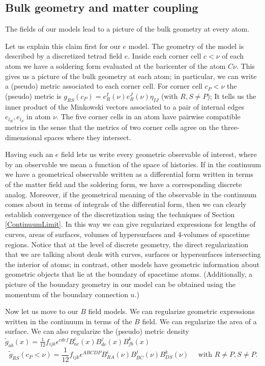 \documentclass{article}
\begin{document}
\subsection{Bulk geometry and matter coupling}

The fields of our models lead to a picture of the bulk geometry at every atom. 

Let us explain this claim first for our $e$ model. The geometry of the model is described by a discretized tetrad field $e$. Inside each corner cell $c < \nu$ of each atom we have a soldering form evaluated at the baricenter of the atom $C\nu$. This gives us a picture of the bulk geometry at each atom; in particular, we can write a (pseudo) metric associated to each corner cell. 
For corner cell $c_P < \nu$ the (pseudo) metric is  
$g_{RS}(c_P) = e_R^I (\nu) e_R^J (\nu) \eta_{IJ}$ (with $R,S \neq P$); 
It tells us the inner product of the Minkowski vectors associated to a pair of internal edges $e_{l_R} , e_{l_S}$ in atom $\nu$. 
The five corner cells in an atom have pairwise compatible metrics in the sense that the metrics of two corner cells agree on the three-dimensional spaces where they intersect. 

Having such an $e$ field lets us write every geometric observable of interest, where by an observable we mean a function of the space of histories. 
If in the continuum we have a geometrical observable written as a differential form written in terms of the matter field and the soldering form, we have a corresponding discrete analog. Moreover, if the geometrical meaning of the observable in the continuum comes about in terms of integrals of the differential form, then we can clearly establish convergence of the discretization using the techniques of Section \ref{ContinuumLimit}. In this way we can give regularized expressions for lengths of curves, areas of surfaces, volumes of hypersurfaces and 4-volumes of spacetime regions. Notice that at the level of discrete geometry, the direct regularization that we are talking about deals with curves, surfaces or hypersurfaces intersecting the interior of atoms; in contrast, other models have geometric information about geometric objects that lie at the boundary of spacetime atoms. (Additionally, a picture of the boundary geometry in our model can be obtained using the momentum of the boundary connection $u$.) 



Now let us move to our $B$ field models. We can regularize geometric expressions written in the continuum in terms of the $B$ field. We can regularize the area of a surface. We can also regularize the (pseudo) metric density\\
$\tilde{g}_{ab}(x)= \frac{1}{12} f_{ijk} \epsilon^{cdef} B^i_{ac}(x) B^j_{de}(x) B^k_{fb}(x)$ 
\[
\tilde{g}_{RS}(c_{P}<\nu)= \frac{1}{12} f_{ijk} \epsilon^{ABCDP} B^i_{RA}(\nu) B^j_{BC}(\nu) B^k_{DS}(\nu) \quad  \mbox{ with }R\neq P, S\neq P. 
\]
\end{document}
